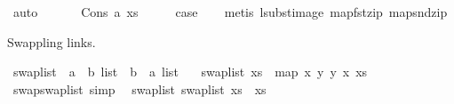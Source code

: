 \begin{isabellebody}
\ auto\isanewline
\ \ \isamarkupfalse%
\isanewline
{}\isamarkupfalse%
\isanewline
\ \ \isamarkupfalse%
\ {\isacharparenleft}{\kern0pt}Cons\ a\ xs{\isacharparenright}{\kern0pt}\isanewline
\ \ \isamarkupfalse%
\ \isamarkupfalse%
\ {\isacharquery}{\kern0pt}case\isanewline
\ \ \isamarkupfalse%
\ {\isacharparenleft}{\kern0pt}metis\ lsubst{\isacharunderscore}{\kern0pt}image\ map{\isacharunderscore}{\kern0pt}fst{\isacharunderscore}{\kern0pt}zip\ map{\isacharunderscore}{\kern0pt}snd{\isacharunderscore}{\kern0pt}zip{\isacharparenright}{\kern0pt}\isanewline
{}\isamarkupfalse%
%
\endisatagproof
{\isafoldproof}%
%
\isadelimproof
%
\endisadelimproof
%
\isadelimdocument
%
\endisadelimdocument
%
\isatagdocument
%
\isamarkuptrue%
%
\endisatagdocument
{\isafolddocument}%
%
\isadelimdocument
%
\endisadelimdocument
%
\begin{isamarkuptext}%
Swappling links.%
\end{isamarkuptext}\isamarkuptrue%
\isamarkupfalse%
\ swap{\isacharunderscore}{\kern0pt}list\ {\isacharcolon}{\kern0pt}{\isacharcolon}{\kern0pt}\ {\isachardoublequoteopen}{\isacharparenleft}{\kern0pt}{\isacharprime}{\kern0pt}a\ {\isacharasterisk}{\kern0pt}\ {\isacharprime}{\kern0pt}b{\isacharparenright}{\kern0pt}\ list\ {\isacharequal}{\kern0pt}{\isachargreater}{\kern0pt}\ {\isacharparenleft}{\kern0pt}{\isacharprime}{\kern0pt}b\ {\isacharasterisk}{\kern0pt}\ {\isacharprime}{\kern0pt}a{\isacharparenright}{\kern0pt}\ list{\isachardoublequoteclose}\isanewline
\ \ \ {\isachardoublequoteopen}swap{\isacharunderscore}{\kern0pt}list\ xs\ {\isasymequiv}\ map\ {\isacharparenleft}{\kern0pt}{\isasymlambda}{\isacharparenleft}{\kern0pt}x{\isacharcomma}{\kern0pt}\ y{\isacharparenright}{\kern0pt}{\isachardot}{\kern0pt}\ {\isacharparenleft}{\kern0pt}y{\isacharcomma}{\kern0pt}\ x{\isacharparenright}{\kern0pt}{\isacharparenright}{\kern0pt}\ xs{\isachardoublequoteclose}\isanewline
\isanewline
{}\isamarkupfalse%
\ swap{\isacharunderscore}{\kern0pt}swap{\isacharunderscore}{\kern0pt}list\ {\isacharbrackleft}{\kern0pt}simp{\isacharbrackright}{\kern0pt}{\isacharcolon}{\kern0pt}\isanewline
\ \ {\isachardoublequoteopen}swap{\isacharunderscore}{\kern0pt}list\ {\isacharparenleft}{\kern0pt}swap{\isacharunderscore}{\kern0pt}list\ xs{\isacharparenright}{\kern0pt}\ {\isacharequal}{\kern0pt}\ xs{\isachardoublequoteclose}\isanewline

\end{isabellebody}
